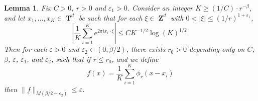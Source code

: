 \documentclass[12pt,reqno]{article}
\numberwithin{equation}{section}
\DeclareMathOperator{\ZZ}{\mathbf{Z}}
\DeclareMathOperator{\TT}{\mathbf{T}}
\newtheorem{lemma}{Lemma}
\begin{document}
\begin{lemma} \label{Lemma65493}
    Fix $C > 0$, $r > 0$ and $\varepsilon_1 > 0$. Consider an integer $K \geq (1/C) \cdot r^{-\beta}$, and let $x_1,\dots,x_K \in \TT^d$ be such that for each $\xi \in \ZZ^d$ with $0 < |\xi| \leq (1/r)^{1 + \varepsilon_1}$,
    \begin{equation} \label{equationOIJDOIJIO}
        \left| \frac{1}{K} \sum_{i = 1}^K e^{2 \pi i x_i \cdot \xi} \right| \leq C K^{-1/2} \log(K)^{1/2}.
    \end{equation}
    Then for each $\varepsilon > 0$ and $\varepsilon_2 \in (0,\beta/2)$, there exists $r_0 > 0$ depending only on $C$, $\beta$, $\varepsilon$, $\varepsilon_1$, and $\varepsilon_2$, such that if $r \leq r_0$, and we define
    \[ f(x) = \frac{1}{K} \sum_{i = 1}^K \phi_r(x - x_i) \]
    then $\| f \|_{M(\beta/2 - \varepsilon_2)} \leq \varepsilon$.
\end{lemma}
\end{document}
